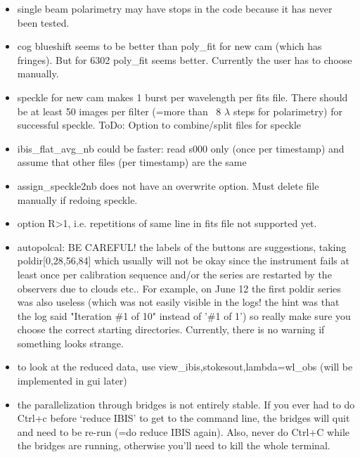 \documentclass[a4paper,11pt]{article}
\begin{document}
\begin{itemize}
\item single beam polarimetry may have stops in the code because it has never been tested.
\item cog blueshift seems to be better than poly\_fit for new cam (which has fringes). But for 6302 poly\_fit seems better. Currently the user has to choose manually.
\item speckle for new cam makes 1 burst per wavelength per fits file. There
  should be at least 50 images per filter (=more than ~8 $\lambda$ steps for polarimetry) for successful speckle. ToDo: Option to combine/split files for speckle
\item ibis\_flat\_avg\_nb could be faster: read s000 only (once per
  timestamp) and assume that other files (per timestamp) are the same
\item assign\_speckle2nb does not have an overwrite option. Must delete file manually if redoing speckle.
\item option R>1, i.e. repetitions of same line in fits file not supported yet.
\item autopolcal: BE CAREFUL! the labels of the buttons are suggestions, taking poldir[0,28,56,84]
    which usually will not be okay since the instrument fails at least once per calibration sequence
    and/or the series are restarted by the observers due to clouds etc.. For example, on June 12 the 
    first poldir series was also useless (which was not easily visible in the logs! the hint was that the
    log said "Iteration  \#1 of 10" instead of '\#1 of 1') so really make sure you choose the 
    correct starting directories. Currently, there is no warning if something looks strange.
\item to look at the reduced data, use view\_ibis,stokesout,lambda=wl\_obs (will be implemented in gui later)
\item the parallelization through bridges is not entirely stable. If you ever had to do Ctrl+c before `reduce IBIS' to get to the command line, the bridges will quit and need to be re-run (=do reduce IBIS again). Also, never do Ctrl+C while the bridges are running, otherwise you'll need to kill the whole terminal.
\end{itemize}




\end{document}
